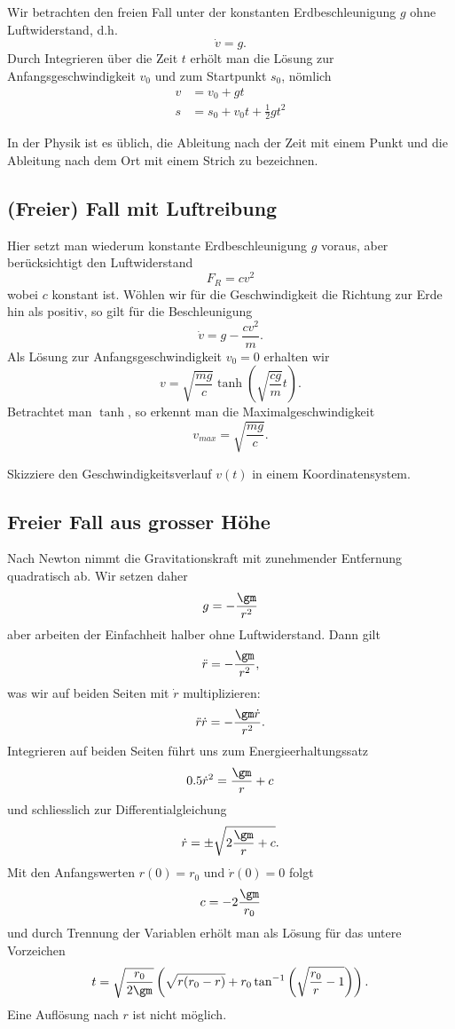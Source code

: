 \documentclass[%
draft,
11pt,%
twoside,%
titlepage,%
german,%
headsepline%
]{scrartcl}
\begin{document}
Wir betrachten den freien Fall unter der konstanten Erdbeschleunigung $g$ ohne Luftwiderstand, d.h.
$$\dot{v}=g.$$
Durch Integrieren \"uber die Zeit $t$ erh\"olt man die L\"osung zur Anfangsgeschwindigkeit $v_0$ und zum Startpunkt $s_0$, n\"omlich
\begin{align*}
v &= v_0+gt\\
s &= s_0+v_0t+\frac{1}{2}gt^2
\end{align*}

\begin{bem}
In der Physik ist es \"ublich, die Ableitung nach der Zeit mit einem Punkt und die Ableitung nach dem Ort mit einem Strich zu bezeichnen.
\end{bem}

\subsection{(Freier) Fall mit Luftreibung}

Hier setzt man wiederum konstante Erdbeschleunigung $g$ voraus, aber ber\"ucksichtigt den Luftwiderstand
$$F_R=cv^2$$
wobei $c$ konstant ist. W\"ohlen wir f\"ur die Geschwindigkeit die Richtung zur Erde hin als positiv, so gilt f\"ur die Beschleunigung
$$\dot{v}=g-\frac{cv^2}{m}.$$
Als L\"osung zur Anfangsgeschwindigkeit $v_0=0$ erhalten wir
$$v=\sqrt{\frac{mg}{c}}\tanh\left(\sqrt{\frac{cg}{m}}t\right).$$
Betrachtet man $\tanh$, so erkennt man die Maximalgeschwindigkeit
$$v_{max}=\sqrt{\frac{mg}{c}}.$$

\begin{ueb}
Skizziere den Geschwindigkeitsverlauf $v(t)$ in einem Koordinatensystem.
\end{ueb}

\subsection{Freier Fall aus grosser H\"ohe}

Nach Newton nimmt die Gravitationskraft mit zunehmender Entfernung quadratisch ab. Wir setzen daher
$$g=-\frac{\gm}{r^2}$$
aber arbeiten der Einfachheit halber ohne Luftwiderstand. Dann gilt
$$\ddot{r}=-\frac{\gm}{r^2},$$
was wir auf beiden Seiten mit $\dot{r}$ multiplizieren:
$$\ddot{r}\dot{r}=-\frac{\gm\dot{r}}{r^2}.$$
Integrieren auf beiden Seiten f\"uhrt uns zum Energieerhaltungssatz
$$0.5\dot{r}^2=\frac{\gm}{r}+c$$
und schliesslich zur Differentialgleichung
$$\dot{r}=\pm\sqrt{2\frac{\gm}{r}+c}.$$
Mit den Anfangswerten $r(0)=r_0$ und $\dot{r}(0)=0$ folgt
$$c=-2\frac{\gm}{r_0}$$
und durch Trennung der Variablen erh\"olt man als L\"osung f\"ur das untere Vorzeichen
$$t=\sqrt{\frac{r_0}{2\gm}}\left(\sqrt{r(r_0-r)}+r_0\tan^{-1}\left(\sqrt{\frac{r_0}{r}-1}\right)\right).$$
Eine Aufl\"osung nach $r$ ist nicht m\"oglich.
\end{document}
